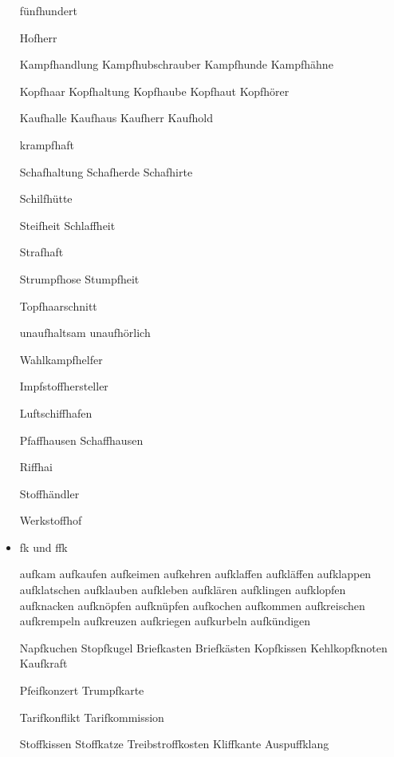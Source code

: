 \begin{itemize}
fünfhundert 

Hofherr

Kampfhandlung Kampfhubschrauber Kampfhunde Kampfhähne

Kopfhaar Kopfhaltung Kopfhaube Kopfhaut Kopfhörer

Kaufhalle Kaufhaus Kaufherr Kaufhold 

krampfhaft

Schafhaltung Schafherde Schafhirte 

Schilfhütte

Steifheit Schlaffheit 

Strafhaft

Strumpfhose Stumpfheit

Topfhaarschnitt

unaufhaltsam unaufhörlich

Wahlkampfhelfer

Impfstoffhersteller 

Luftschiffhafen

Pfaffhausen Schaffhausen

Riffhai

Stoffhändler

Werkstoffhof


\item \mbox{fk} und \mbox{ffk}

aufkam aufkaufen aufkeimen aufkehren aufklaffen aufkläffen aufklappen aufklatschen aufklauben aufkleben aufklären aufklingen aufklopfen aufknacken aufknöpfen aufknüpfen aufkochen aufkommen aufkreischen aufkrempeln aufkreuzen aufkriegen aufkurbeln aufkündigen

Napfkuchen Stopfkugel Briefkasten Briefkästen Kopfkissen
 Kehlkopfknoten Kaufkraft

Pfeifkonzert Trumpfkarte

Tarifkonflikt Tarifkommission 

Stoffkissen Stoffkatze Treibstroffkosten Kliffkante Auspuffklang

\end{itemize}




